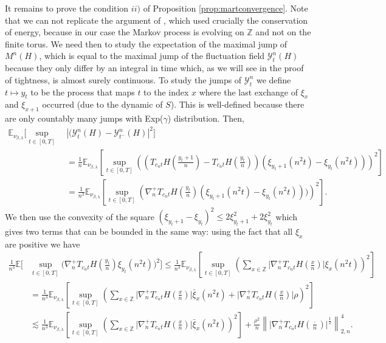 \documentclass[a4paper, reqno, 12pt]{amsart}
\theoremstyle{plain}
\theoremstyle{definition}
\newcommand{\ee}[1]{\mathbb{E}_{\nu_{\beta,\lambda}}\left[ #1 \right]}
\newcommand{\Z}{\mathbb{Z}}
\begin{document}
It remains to prove the condition $ii)$ of Proposition \ref{prop:martconvergence}. Note that we can not replicate the argument of \cite{ABGS22}, which used crucially the conservation of energy,  because in our case the Markov process is evolving on $\Z$ and not on the  finite torus. 
We need then to study the expectation of the maximal jump of $M^n(H)$, which is equal to the maximal jump of the fluctuation field $\mathcal Y^n_t(H)$ because they only differ by an integral in time which, as we will see in the proof of tightness, is almost surely continuous.
To study the jumps of $\mathcal{Y}^n_t$ we define $t\mapsto y_t$ to be the process that maps $t$ to the index $x$ where the last exchange of $\xi_x$ and $\xi_{x+1}$ occurred (due to the dynamic of $S$). This is well-defined because there are only countably many jumps with Exp($\gamma$)  distribution. Then,
\begin{align*}
    \mathbb E_{\nu_{\beta,\lambda}} \bigg[\sup_{t\in[0,T]}\ &|(\mathcal{Y}^n_t(H)-\mathcal{Y}^n_{t^-}(H)|^2\bigg]\\ &= \frac{1}{n}\ee{\sup_{t\in[0,T]} \left(\left( T_{c_nt}H\left(\frac{y_t+1}{n}\right)-T_{c_nt}H\left(\frac{y_t}{n}\right)\right)\left(\xi_{y_t+1}(n^2t)-\xi_{y_t}(n^2t)\right)\right)^2}\\
    & = \frac{1}{n^3}\ee{\sup_{t\in[0,T]} \left( \nabla_n^+T_{c_nt}H\left(\frac{y_t}{n}\right)\left(\xi_{y_t+1} (n^2t)-\xi_{y_t}(n^2t)\right))\right)^2}.
\end{align*}
We then use the convexity of the square $\left(\xi_{y_t+1} -\xi_{y_t}\right)^2\leq 2\xi_{y_t + 1}^2 + 2\xi_{y_t}^2$ which gives two terms that can be bounded in the same way: using the fact that all $\xi_x$ are positive we have
\begin{align*}
   \frac{1}{n^3}\mathbb E\Bigg[ & \sup_{t\in[0,T]} \bigg( \nabla_n^+T_{c_nt}H\left(\frac{y_t}{n}\right)\xi_{y_t}(n^2t)\bigg)^2 \Bigg]  \leq \frac{1}{n^3}\ee{\sup_{t\in[0,T]} \left( \sum_{x\in\Z} \bigg|\nabla_n^+T_{c_nt}H\left(\frac{x}{n}\right)\bigg|\xi_{x}(n^2t)\right)^2} \\ 
   & = \frac{1}{n^3} \ee{\sup_{t\in[0,T]} \left( \sum_{x\in\Z} \bigg|\nabla_n^+T_{c_nt}H\left(\frac{x}{n}\right)\bigg|\bar{\xi}_{x}(n^2t) + \bigg|\nabla_n^+T_{c_nt}H\left(\frac{x}{n}\right)\bigg|\rho\right)^2}\\
   & \lesssim \frac{1}{n^3} \ee{\sup_{t\in[0,T]} \left( \sum_{x\in\Z} \bigg|\nabla_n^+T_{c_nt}H\left(\frac{x}{n}\right)\bigg|\bar{\xi}_{x}(n^2t) \right)^2} + \frac{\rho^2}{n}\left\|\bigg|\nabla_n^+T_{c_nt}H\left(\frac{\cdot}{n}\right)\bigg|^{\frac{1}{2}} \right\|^4_{2,n}.
\end{align*}
\end{document}
